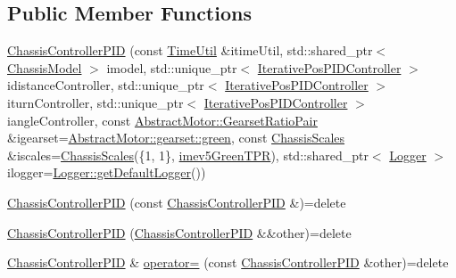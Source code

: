 \subsection*{Public Member Functions}
\begin{DoxyCompactItemize}
\item 
\mbox{\hyperlink{classokapi_1_1ChassisControllerPID_aa12293b3f0dd245f1489ba4dbc009086}{Chassis\+Controller\+P\+ID}} (const \mbox{\hyperlink{classokapi_1_1TimeUtil}{Time\+Util}} \&itime\+Util, std\+::shared\+\_\+ptr$<$ \mbox{\hyperlink{classokapi_1_1ChassisModel}{Chassis\+Model}} $>$ imodel, std\+::unique\+\_\+ptr$<$ \mbox{\hyperlink{classokapi_1_1IterativePosPIDController}{Iterative\+Pos\+P\+I\+D\+Controller}} $>$ idistance\+Controller, std\+::unique\+\_\+ptr$<$ \mbox{\hyperlink{classokapi_1_1IterativePosPIDController}{Iterative\+Pos\+P\+I\+D\+Controller}} $>$ iturn\+Controller, std\+::unique\+\_\+ptr$<$ \mbox{\hyperlink{classokapi_1_1IterativePosPIDController}{Iterative\+Pos\+P\+I\+D\+Controller}} $>$ iangle\+Controller, const \mbox{\hyperlink{structokapi_1_1AbstractMotor_1_1GearsetRatioPair}{Abstract\+Motor\+::\+Gearset\+Ratio\+Pair}} \&igearset=\mbox{\hyperlink{classokapi_1_1AbstractMotor_a88aaa6ea2fa10f5520a537bbf26774d5a9f27410725ab8cc8854a2769c7a516b8}{Abstract\+Motor\+::gearset\+::green}}, const \mbox{\hyperlink{classokapi_1_1ChassisScales}{Chassis\+Scales}} \&iscales=\mbox{\hyperlink{classokapi_1_1ChassisScales}{Chassis\+Scales}}(\{1, 1\}, \mbox{\hyperlink{namespaceokapi_a5263bab3bfecd482a573b6d04fb584ac}{imev5\+Green\+T\+PR}}), std\+::shared\+\_\+ptr$<$ \mbox{\hyperlink{classokapi_1_1Logger}{Logger}} $>$ ilogger=\mbox{\hyperlink{classokapi_1_1Logger_a5053cf778b4b55acba788a3797dc96d2}{Logger\+::get\+Default\+Logger}}())
\item 
\mbox{\hyperlink{classokapi_1_1ChassisControllerPID_a25b31c86a76d08d4f58c6efdb8c7ee57}{Chassis\+Controller\+P\+ID}} (const \mbox{\hyperlink{classokapi_1_1ChassisControllerPID}{Chassis\+Controller\+P\+ID}} \&)=delete
\item 
\mbox{\hyperlink{classokapi_1_1ChassisControllerPID_ae486bf897f588847f5f8d8ba4248da88}{Chassis\+Controller\+P\+ID}} (\mbox{\hyperlink{classokapi_1_1ChassisControllerPID}{Chassis\+Controller\+P\+ID}} \&\&other)=delete
\item 
\mbox{\hyperlink{classokapi_1_1ChassisControllerPID}{Chassis\+Controller\+P\+ID}} \& \mbox{\hyperlink{classokapi_1_1ChassisControllerPID_ad3c879b42ad7f5a0d05b2799a9e5c3dd}{operator=}} (const \mbox{\hyperlink{classokapi_1_1ChassisControllerPID}{Chassis\+Controller\+P\+ID}} \&other)=delete

\end{DoxyCompactItemize}
